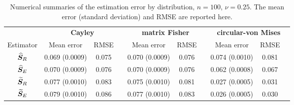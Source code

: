 \begin{center}
\begin{table}[h!]
\caption{Numerical summaries of the estimation error  by distribution, $n=100$,  $\nu=0.25$.  The mean error (standard deviation) and RMSE are reported here.  \label{tab:alldN100Nu25}}
\begin{tabular}{cccccccccc}
  \hline
		 &\multicolumn{3}{c}{\textbf{Cayley}} & \multicolumn{3}{c}{\textbf{matrix Fisher}}  & \multicolumn{3}{c}{\textbf{circular-von Mises}}\\ 
Estimator &   Mean error  & RMSE& &  Mean error & RMSE& &   Mean error& RMSE \\  \hline \hline %
 		  ${\widehat{\bm S}_R}$  &  0.069 (0.0009)& 0.075 & &  0.070 (0.0009)& 0.076&  & 0.074 (0.0010)& 0.081 \\ 
 		 ${\widehat{\bm S}_E}$ &   0.070 (0.0009)& 0.076 & &  0.070 (0.0009)& 0.076&  &  0.062 (0.0008)& 0.067\\ 
		 ${\widetilde{\bm S}_R}$   & 0.077 (0.0010)& 0.083 & &  0.075 (0.0010)& 0.081&  & 0.027 (0.0005)& 0.031\\ 
 		  ${\widetilde{\bm S}_E}$ & 0.079 (0.0010)& 0.086 & &  0.077 (0.0010)& 0.083 & & 0.026 (0.0005)& 0.030\\ \hline
\end{tabular}
\end{table}
\end{center}

